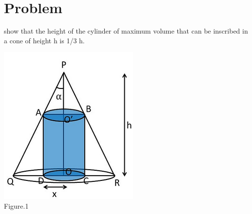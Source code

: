 \documentclass[10pt, a4paper]{article}
\title{\mytitle}
\author{\myauthor\hspace{1em}\\\contact\\FWC22011\hspace{6.5em}IITH\hspace{0.5em}\mymodule\hspace{6em} Assignment}
\date{}
\begin{document}
	\maketitle
	\tableofcontents
   \section{Problem}
show that the height of the cylinder of maximum volume that can be inscribed in a cone of height h is 1/3 h.\\
\begin{center}
{\includegraphics[scale=0.5]{figure.png}}\\
Figure.1
\end{center}
\end{document}
